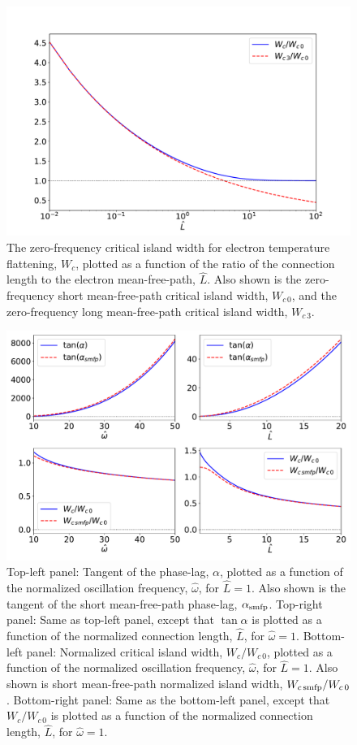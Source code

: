 \documentclass[12pt,prb,aps]{revtex4-1}
\begin{document}
\begin{figure}
\centerline{\includegraphics[width=1.0\textwidth]{zero.pdf}}
\caption{ The zero-frequency critical island width for electron temperature flattening, $W_c$, plotted as a function of the ratio of the connection length to the electron
mean-free-path, $\hat{L}$.
Also shown is the zero-frequency short mean-free-path critical island width, $W_{c\,0}$, and the zero-frequency long mean-free-path
critical island width, $W_{c\,3}$.\label{fig3}}
\end{figure}

\begin{figure}
\centerline{\includegraphics[width=1.0\textwidth]{smfp.pdf}}
\caption{Top-left panel: Tangent of the phase-lag, $\alpha$, plotted as a function of the normalized oscillation frequency, $\hat{\omega}$, for  $\hat{L}=1$. Also
shown is the tangent of the short mean-free-path phase-lag, $\alpha_{\rm smfp}$. Top-right panel: Same as top-left panel, except that
$\tan\alpha$ is plotted as a function of the normalized 
connection length, $\hat{L}$, for  $\hat{\omega}=1$.
Bottom-left panel: Normalized critical island width, $W_c/W_{c\,0}$,  plotted as a function of the normalized oscillation frequency, $\hat{\omega}$, for  $\hat{L}=1$. Also
shown is  short mean-free-path normalized island width, $W_{c\,{\rm smfp}}/W_{c\,0}$.  
Bottom-right panel: Same as the bottom-left panel, except that $W_c/W_{c\,0}$ is plotted as a function of the normalized 
connection length, $\hat{L}$, for  $\hat{\omega}=1$.
  \label{fig4}}
\end{figure}
\end{document}
